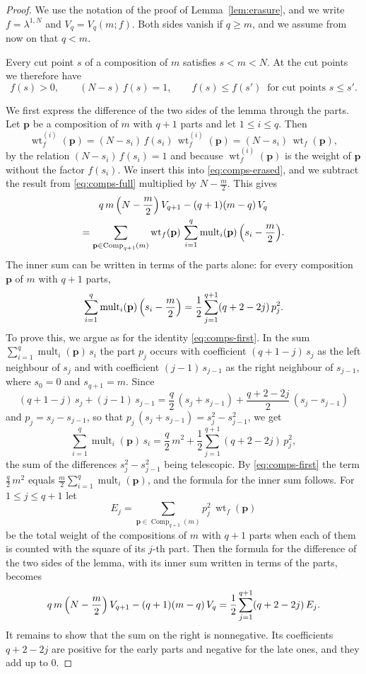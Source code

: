 \documentclass{amsart}
\theoremstyle{definition}
\theoremstyle{remark}
\numberwithin{equation}{section}
\begin{document}
\begin{proof}
We use the notation of the proof of Lemma~\ref{lem:erasure}, and we write $f=\lambda^{1,N}$ and $V_q=V_q(m;f)$. Both sides vanish if $q\ge m$, and we assume from now on that $q<m$.

Every cut point $s$ of a composition of $m$ satisfies $s<m<N$. At the cut points we therefore have
\[
f(s)>0,\qquad (N-s)\,f(s)=1,\qquad f(s)\le f(s')\ \text{ for cut points } s\le s'.
\]

We first express the difference of the two sides of the lemma through the parts. Let $\mathbf p$ be a composition of $m$ with $q+1$ parts and let $1\le i\le q$. Then
\[
\operatorname{wt}_f^{(i)}(\mathbf p)=(N-s_i)\,f(s_i)\,\operatorname{wt}_f^{(i)}(\mathbf p)=(N-s_i)\,\operatorname{wt}_f(\mathbf p),
\]
by the relation $(N-s_i)\,f(s_i)=1$ and because $\operatorname{wt}_f^{(i)}(\mathbf p)$ is the weight of $\mathbf p$ without the factor $f(s_i)$. We insert this into \eqref{eq:comps-erased}, and we subtract the result from \eqref{eq:comps-full} multiplied by $N-\frac m2$. This gives
\begin{multline*}
q\,m\,\Bigl(N-\frac{m}{2}\Bigr)\,V_{q+1}-(q+1)(m-q)\,V_q\\
=\sum_{\mathbf p\in\operatorname{Comp}_{q+1}(m)}\operatorname{wt}_f(\mathbf p)\,\sum_{i=1}^{q}\operatorname{mult}_i(\mathbf p)\,\Bigl(s_i-\frac{m}{2}\Bigr).
\end{multline*}
The inner sum can be written in terms of the parts alone: for every composition $\mathbf p$ of $m$ with $q+1$ parts,
\[
\sum_{i=1}^{q}\operatorname{mult}_i(\mathbf p)\,\Bigl(s_i-\frac{m}{2}\Bigr)=\frac12\sum_{j=1}^{q+1}(q+2-2j)\,p_j^{2}.
\]
To prove this, we argue as for the identity \eqref{eq:comps-first}. In the sum $\sum_{i=1}^{q}\operatorname{mult}_i(\mathbf p)\,s_i$ the part $p_j$ occurs with coefficient $(q+1-j)\,s_j$ as the left neighbour of $s_j$ and with coefficient $(j-1)\,s_{j-1}$ as the right neighbour of $s_{j-1}$, where $s_0=0$ and $s_{q+1}=m$. Since
\[
(q+1-j)\,s_j+(j-1)\,s_{j-1}=\frac{q}{2}\,(s_j+s_{j-1})+\frac{q+2-2j}{2}\,(s_j-s_{j-1})
\]
and $p_j=s_j-s_{j-1}$, so that $p_j\,(s_j+s_{j-1})=s_j^{2}-s_{j-1}^{2}$, we get
\[
\sum_{i=1}^{q}\operatorname{mult}_i(\mathbf p)\,s_i=\frac{q}{2}\,m^{2}+\frac12\sum_{j=1}^{q+1}(q+2-2j)\,p_j^{2},
\]
the sum of the differences $s_j^{2}-s_{j-1}^{2}$ being telescopic. By \eqref{eq:comps-first} the term $\frac q2\,m^{2}$ equals $\frac m2\sum_{i=1}^{q}\operatorname{mult}_i(\mathbf p)$, and the formula for the inner sum follows. For $1\le j\le q+1$ let
\[
E_j=\sum_{\mathbf p\in\operatorname{Comp}_{q+1}(m)}p_j^{2}\,\operatorname{wt}_f(\mathbf p)
\]
be the total weight of the compositions of $m$ with $q+1$ parts when each of them is counted with the square of its $j$-th part. Then the formula for the difference of the two sides of the lemma, with its inner sum written in terms of the parts, becomes
\[
q\,m\,\Bigl(N-\frac{m}{2}\Bigr)\,V_{q+1}-(q+1)(m-q)\,V_q=\frac12\sum_{j=1}^{q+1}(q+2-2j)\,E_j .
\]
It remains to show that the sum on the right is nonnegative. Its coefficients $q+2-2j$ are positive for the early parts and negative for the late ones, and they add up to $0$.


\end{proof}
\end{document}
